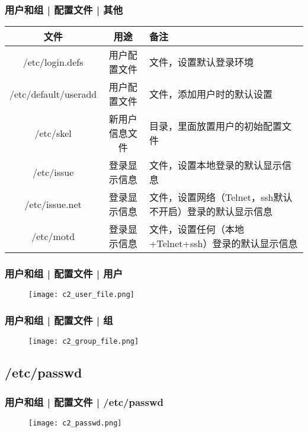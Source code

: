 \begin{frame}
  \frametitle{用户和组 | 配置文件 | 其他}
  \begin{table}
    \centering
    \begin{tabularx}{\textwidth}{ccX}
      \hline
      \rowcolor{blue!50}文件 & 用途 & 备注\\
      \hline
      /etc/login.defs & 用户配置文件 & 文件，设置默认登录环境\\
      /etc/default/useradd & 用户配置文件 & 文件，添加用户时的默认设置\\
      /etc/skel & 新用户信息文件 & 目录，里面放置用户的初始配置文件\\
      /etc/issue & 登录显示信息 & 文件，设置本地登录的默认显示信息\\
      /etc/issue.net & 登录显示信息 & 文件，设置网络（Telnet，ssh默认不开启）登录的默认显示信息\\
      /etc/motd & 登录显示信息 & 文件，设置任何（本地+Telnet+ssh）登录的默认显示信息\\
      \hline
    \end{tabularx}
  \end{table}
\end{frame}

\begin{frame}
  \frametitle{用户和组 | 配置文件 | 用户}
  \begin{figure}
    \centering
    \texttt{[image: c2\_user\_file.png]}
  \end{figure}
\end{frame}

\begin{frame}
  \frametitle{用户和组 | 配置文件 | 组}
  \begin{figure}
    \centering
    \texttt{[image: c2\_group\_file.png]}
  \end{figure}
\end{frame}

\subsection{/etc/passwd}
\begin{frame}
  \frametitle{用户和组 | 配置文件 | /etc/passwd}
  \begin{figure}
    \centering
    \texttt{[image: c2\_passwd.png]}
  \end{figure}
\end{frame}

